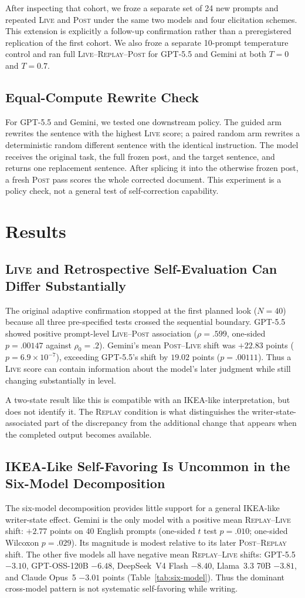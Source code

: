 \documentclass[10pt]{article}
\newcommand{\live}{\textsc{Live}}
\newcommand{\replay}{\textsc{Replay}}
\newcommand{\post}{\textsc{Post}}
\newcommand{\papersection}[1]{\Needspace{4.4\baselineskip}\section{#1}}
\newcommand{\papersubsection}[1]{\Needspace{3.8\baselineskip}\subsection{#1}}
\begin{document}
After inspecting that cohort, we froze a separate set of 24 new prompts and repeated \live{} and \post{} under the same two models and four elicitation schemes. This extension is explicitly a follow-up confirmation rather than a preregistered replication of the first cohort. We also froze a separate 10-prompt temperature control and ran full \live{}--\replay{}--\post{} for GPT-5.5 and Gemini at both $T=0$ and $T=0.7$.

\papersubsection{Equal-Compute Rewrite Check}
For GPT-5.5 and Gemini, we tested one downstream policy. The guided arm rewrites the sentence with the highest \live{} score; a paired random arm rewrites a deterministic random different sentence with the identical instruction. The model receives the original task, the full frozen post, and the target sentence, and returns one replacement sentence. After splicing it into the otherwise frozen post, a fresh \post{} pass scores the whole corrected document. This experiment is a policy check, not a general test of self-correction capability.

\papersection{Results}
\papersubsection{\live{} and Retrospective Self-Evaluation Can Differ Substantially}
The original adaptive confirmation stopped at the first planned look ($N=40$) because all three pre-specified tests crossed the sequential boundary. GPT-5.5 showed positive prompt-level \live{}--\post{} association ($\rho=.599$, one-sided $p=.00147$ against $\rho_0=.2$). Gemini's mean \post{}--\live{} shift was $+22.83$ points ($p=6.9\times10^{-7}$), exceeding GPT-5.5's shift by $19.02$ points ($p=.00111$). Thus a \live{} score can contain information about the model's later judgment while still changing substantially in level.

A two-state result like this is compatible with an IKEA-like interpretation, but does not identify it. The \replay{} condition is what distinguishes the writer-state-associated part of the discrepancy from the additional change that appears when the completed output becomes available.

\papersubsection{IKEA-Like Self-Favoring Is Uncommon in the Six-Model Decomposition}
The six-model decomposition provides little support for a general IKEA-like writer-state effect. Gemini is the only model with a positive mean \replay{}--\live{} shift: $+2.77$ points on 40 English prompts (one-sided $t$ test $p=.010$; one-sided Wilcoxon $p=.029$). Its magnitude is modest relative to its later \post{}--\replay{} shift. The other five models all have negative mean \replay{}--\live{} shifts: GPT-5.5 $-3.10$, GPT-OSS-120B $-6.48$, DeepSeek~V4 Flash $-8.40$, Llama~3.3 70B $-3.81$, and Claude Opus~5 $-3.01$ points (Table~\ref{tab:six-model}). Thus the dominant cross-model pattern is not systematic self-favoring while writing.
\end{document}
